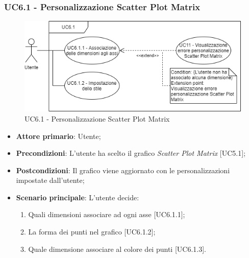 \subsubsection{UC6.1 - Personalizzazione Scatter Plot Matrix}
\begin{figure}[h]
\includegraphics[width=\linewidth]{Section/Images/UC6.1.png}
\centering
\caption{UC6.1 - Personalizzazione Scatter Plot Matrix}
\end{figure}
\begin{itemize}
	\item \textbf{Attore primario}: Utente;
	
	\item \textbf{Precondizioni}: L'utente ha scelto il grafico \textit{Scatter Plot Matrix} [UC5.1];
	
	\item \textbf{Postcondizioni}: Il grafico viene aggiornato con le personalizzazioni impostate dall'utente;
	
	\item \textbf{Scenario principale}: L'utente decide:

\begin{enumerate}
\item Quali dimensioni associare ad ogni asse [UC6.1.1];
\item La forma dei punti nel grafico [UC6.1.2];
\item Quale dimensione associare al colore dei punti [UC6.1.3].
\end{enumerate}	
	
		

\end{itemize}


